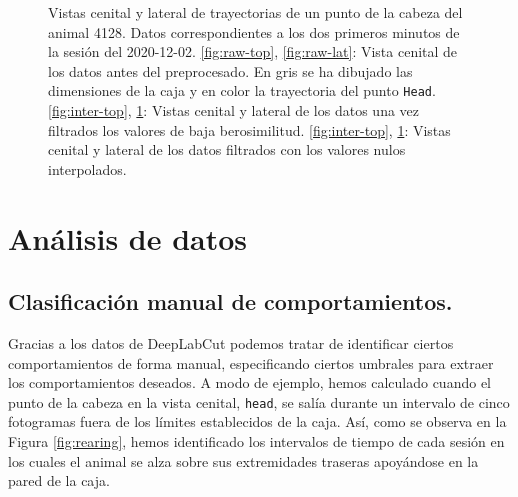 \begin{figure}[p]
\begin{subfigure}{0.38\textwidth}
    \caption{}
    \label{fig:inter-lat}
  \end{subfigure}
  \caption[Trayectorias durante el preprocesamiento.]{Vistas cenital y lateral de trayectorias de un punto de la cabeza del animal 4128. Datos correspondientes a los dos primeros minutos de la sesión del 2020-12-02. \ref{fig:raw-top}, \ref{fig:raw-lat}: Vista cenital de los datos antes del preprocesado. En gris se ha dibujado las dimensiones de la caja y en color la trayectoria del punto \texttt{Head}. \ref{fig:inter-top}, \ref{fig:inter-lat}: Vistas cenital y lateral de los datos una vez filtrados los valores de baja berosimilitud. \ref{fig:inter-top}, \ref{fig:inter-lat}: Vistas cenital y lateral de los datos filtrados con los valores nulos interpolados. }
  \label{fig:interpolated-trayectories}
\end{figure}





\newpage
\section{Análisis de datos} \label{sec:análisis}

\subsection{Clasificación manual de comportamientos.}
Gracias a los datos de DeepLabCut podemos tratar de identificar ciertos comportamientos de forma manual, especificando ciertos umbrales para extraer los comportamientos deseados. A modo de ejemplo, hemos calculado cuando el punto de la cabeza en la vista cenital, \texttt{head}, se salía durante un intervalo de cinco fotogramas fuera de los límites establecidos de la caja. Así, como se observa en la Figura \ref{fig:rearing}, hemos identificado los intervalos de tiempo de cada sesión en los cuales el animal se alza sobre sus extremidades traseras apoyándose en la pared de la caja.

